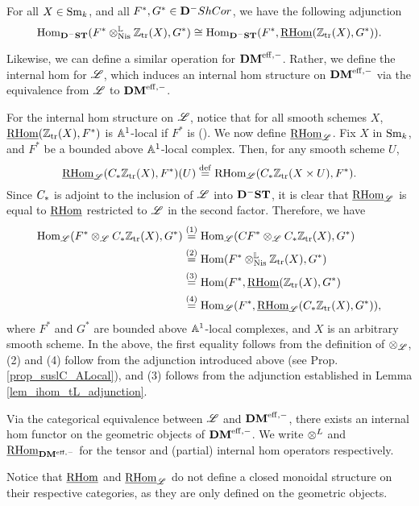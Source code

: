 \begin{lem}\label{lem_ihom_tL_adjunction}
For all $X \in \Sm$, and all $F^*, G^* \in \DCat^-\ShCor$, we have
the following adjunction
\[
\hom_{\DShCor}(F^*\tLNis \Ztr(X), G^*) \cong
\hom_{\DShCor}(F^*, \sheaf{\rhom}(\Ztr(X), G^*)).
\]
\end{lem}

Likewise, we can define a similar operation for $\DMeff$. Rather,
we define the internal hom for $\ALocal$, which induces an internal
hom structure on $\DMeff$ via the equivalence from $\ALocal$ to
$\DMeff$.

For the internal hom structure on $\ALocal$, notice that for all
smooth schemes $X$, $\sheaf{\rhom}(\Ztr(X), F^*)$ is $\A^1$-local if 
$F^*$ is (\cite[14.12]{MVW}). We now define $\ihomAL$. Fix $X$ in
$\Sm$, and $F^*$ be a bounded above $\A^1$-local complex. Then, for
any smooth scheme $U$,
\[
\ihomAL(\suslC \Ztr(X), F^*)(U) \defeq \rhom_{\ALocal}(\suslC 
   \Ztr(X \times U), F^*).
\]
Since $\suslC$ is adjoint to the inclusion of $\ALocal$ into 
$\DShCor$, it is clear that $\ihomAL$ is equal to $\sheaf{\rhom}$
restricted to $\ALocal$ in the second factor. Therefore, we have
\begin{align*}
\hom_{\ALocal}(F^* \tAL \suslC \Ztr(X), G^*) &\stackrel{(1)}{=}
\hom_{\ALocal}(\suslC[] F^* \tAL \suslC \Ztr(X), G^*) \\ 
&\stackrel{(2)}{=} \hom(F^* \tLNis \Ztr(X), G^*) \\
&\stackrel{(3)}{=} \hom(F^*, \sheaf{\rhom}(\Ztr(X), G^*) \\
&\stackrel{(4)}{=} \hom_{\ALocal}(F^*, \ihomAL(\suslC \Ztr(X), G^*)),
\end{align*}
where $F^*$ and $G^*$ are bounded above $\A^1$-local complexes,
and $X$ is an arbitrary smooth scheme. In the above, the first 
equality follows from the definition of $\tAL$, (2) and (4) 
follow from the adjunction introduced above (see Prop.  
\ref{prop_suslC_ALocal}), and (3) follows from the adjunction
established in Lemma \ref{lem_ihom_tL_adjunction}. 

Via the categorical equivalence between $\ALocal$ and $\DMeff$,
there exists an internal hom functor on the geometric objects
of $\DMeff$. We write $\tDM$ and $\ihomDMf$ for the tensor and
(partial) internal hom operators respectively.

\begin{rmk}\label{rmk_partial_ihom}
Notice that $\sheaf{\rhom}$ and $\ihomAL$ do not define a closed
monoidal structure on their respective categories, as they are only
defined on the geometric objects.
\end{rmk}

